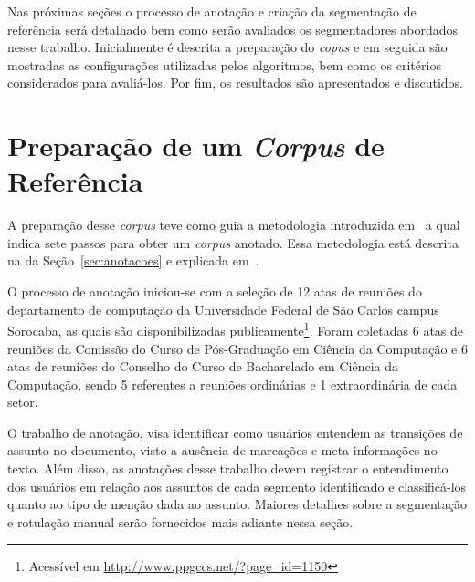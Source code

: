 Nas próximas seções o processo de anotação e criação da segmentação de referência será detalhado bem como serão avaliados os segmentadores abordados nesse trabalho. Inicialmente é descrita a preparação do \textit{copus} e em seguida são mostradas as configurações utilizadas pelos algoritmos, bem como os critérios considerados para avaliá-los. Por fim, os resultados são apresentados e discutidos.




\section{Preparação de um \textit{Corpus} de Referência}
\label{sec:preparacaocorpusreferencia}



A preparação desse \textit{corpus} teve como guia a metodologia introduzida em~\cite{Hovy2010} a qual indica sete passos para obter um \textit{corpus} anotado. Essa metodologia está descrita na da Seção~\ref{sec:anotacoes} e explicada em~\cite{Cardoso2017}. 



O processo de anotação iniciou-se com a seleção de 12 atas de reuniões do departamento de computação da Universidade Federal de São Carlos campus Sorocaba, as quais são disponibilizadas publicamente\footnote{Acessível em  \url{http://www.ppgccs.net/?page\_id=1150}}. Foram coletadas 6 atas de reuniões da Comissão do Curso de Pós-Graduação em Ciência da Computação e 6 atas de reuniões do Conselho do Curso de Bacharelado em Ciência da Computação, sendo 5 referentes a reuniões ordinárias e 1 extraordinária de cada setor.

O trabalho de anotação, visa identificar como usuários entendem as transições de assunto no documento, visto a ausência de marcações e meta informações no texto. Além disso, as anotações desse trabalho devem registrar o entendimento dos usuários em relação aos assuntos de cada segmento identificado e classificá-los quanto ao tipo de menção dada ao assunto. Maiores detalhes sobre a segmentação e rotulação manual serão fornecidos mais adiante nessa seção.


